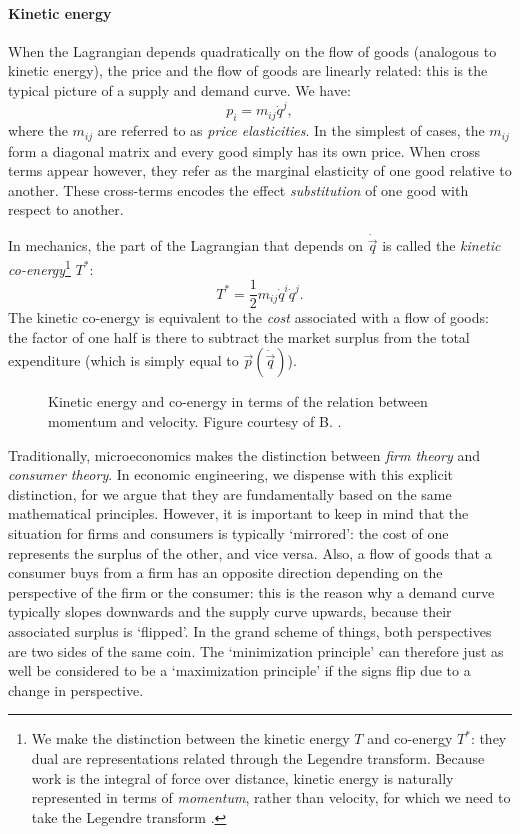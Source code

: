 \paragraph{Kinetic energy} When the Lagrangian depends quadratically on the flow of goods (analogous to kinetic energy), the price and the flow of goods are linearly related: this is the typical picture of a supply and demand curve. We have:
$$ p_i = m_{ij} \dot{q}^j, $$
where the $m_{ij}$ are referred to as \emph{price elasticities}. In the simplest of cases, the $m_{ij}$ form a diagonal matrix and every good simply has its own price. When cross terms appear however, they refer as the marginal elasticity of one good relative to another. These cross-terms encodes the effect \emph{substitution} of one good with respect to another. 

In mechanics, the part of the Lagrangian that depends on $\dot{\vec{q}}$ is called the \emph{kinetic co-energy}\footnote{We make the distinction between the kinetic energy $T$ and co-energy $T^*$: they dual are representations related through the Legendre transform. Because work is the integral of force over distance, kinetic energy is naturally represented in terms of \emph{momentum}, rather than velocity, for which we need to take the Legendre transform \cite{Jeltsema2009}.} $T^*$:
\begin{equation}
    T^* = \frac{1}{2}m_{ij}\dot{q}^i \dot{q}^j.
\end{equation} 
The kinetic co-energy is equivalent to the \emph{cost} associated with a flow of goods: the factor of one half is there to subtract the market surplus from the total expenditure (which is simply equal to $\vec{p}(\dot{\vec{q}})$).

\begin{figure}
    \centering
    
    \caption{Kinetic energy and co-energy in terms of the relation between momentum and velocity. Figure courtesy of B. \citet{Krabbenborg2021}.}
    \label{fig:kinetic_energy}
\end{figure}

Traditionally, microeconomics makes the distinction between \emph{firm theory} and \emph{consumer theory}. In economic engineering, we dispense with this explicit distinction, for we argue that they are fundamentally based on the same mathematical principles. However, it is important to keep in mind that the situation for firms and consumers is typically `mirrored': the cost of one represents the surplus of the other, and vice versa. Also, a flow of goods that a consumer buys from a firm has an opposite direction depending on the perspective of the firm or the consumer: this is the reason why a demand curve typically slopes downwards and the supply curve upwards, because their associated surplus is `flipped'. In the grand scheme of things, both perspectives are two sides of the same coin. The `minimization principle' can therefore just as well be considered to be a `maximization principle' if the signs flip due to a change in perspective.

